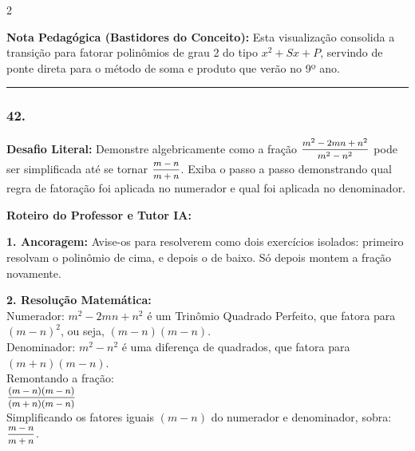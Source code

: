 \begin{multicols*}{2}
    \begin{boxexplicacao}
    \textbf{Nota Pedagógica (Bastidores do Conceito):} Esta visualização consolida a transição para fatorar polinômios de grau 2 do tipo $x^2 + Sx + P$, servindo de ponte direta para o método de soma e produto que verão no 9º ano.
    \end{boxexplicacao}
\fi

\par\vspace{\espacoQuestao}

\noindent\textcolor{CorLinha}{\rule{\linewidth}{0.5pt}} 
\par\vspace{\espacoPreQuestao}
\subsubsection*{42.} 
\begin{enunciadoLiteral}
\textbf{Desafio Literal:} Demonstre algebricamente como a fração $ \mfrac{m^2 - 2mn + n^2}{m^2 - n^2} $ pode ser simplificada até se tornar $ \mfrac{m - n}{m + n} $. Exiba o passo a passo demonstrando qual regra de fatoração foi aplicada no numerador e qual foi aplicada no denominador.
\end{enunciadoLiteral}

\ifgabarito
    \begin{tcolorbox}[colback=CorTitUm!5, colframe=CorTitUm, boxrule=1pt, arc=4pt, left=6pt, right=6pt, top=6pt, bottom=6pt]
    \small\textbf{\textcolor{CorTitUm}{Roteiro do Professor e Tutor IA:}}\par\vspace{0.1cm}
    \color{CinzaEscuro}
    \textbf{1. Ancoragem:} Avise-os para resolverem como dois exercícios isolados: primeiro resolvam o polinômio de cima, e depois o de baixo. Só depois montem a fração novamente.\par\vspace{0.1cm}
    \textbf{2. Resolução Matemática:}\\
    Numerador: $m^2 - 2mn + n^2$ é um Trinômio Quadrado Perfeito, que fatora para $(m - n)^2$, ou seja, $(m - n)(m - n)$.\\
    Denominador: $m^2 - n^2$ é uma diferença de quadrados, que fatora para $(m + n)(m - n)$.\\
    Remontando a fração:\\
    $ \mfrac{(m - n)(m - n)}{(m + n)(m - n)} $\\
    Simplificando os fatores iguais $(m - n)$ do numerador e denominador, sobra:\\
    $ \mfrac{m - n}{m + n} $.
    \end{tcolorbox}
\fi


\end{multicols*}
